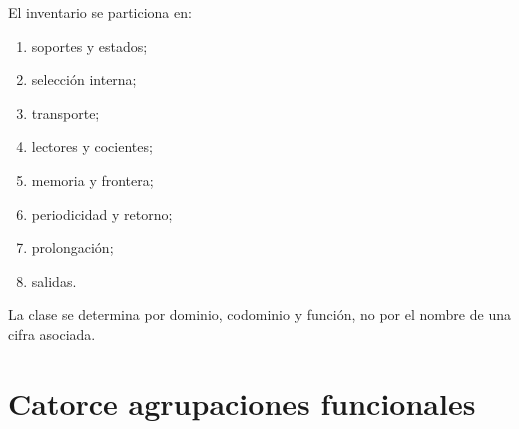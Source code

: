 El inventario se particiona en:
\begin{enumerate}
 \item[\textbf{C1.}] soportes y estados;
 \item[\textbf{C2.}] selección interna;
 \item[\textbf{C3.}] transporte;
 \item[\textbf{C4.}] lectores y cocientes;
 \item[\textbf{C5.}] memoria y frontera;
 \item[\textbf{C6.}] periodicidad y retorno;
 \item[\textbf{C7.}] prolongación;
 \item[\textbf{C8.}] salidas.
\end{enumerate}
La clase se determina por dominio, codominio y función, no por el nombre de
una cifra asociada.

\section{Catorce agrupaciones funcionales}

